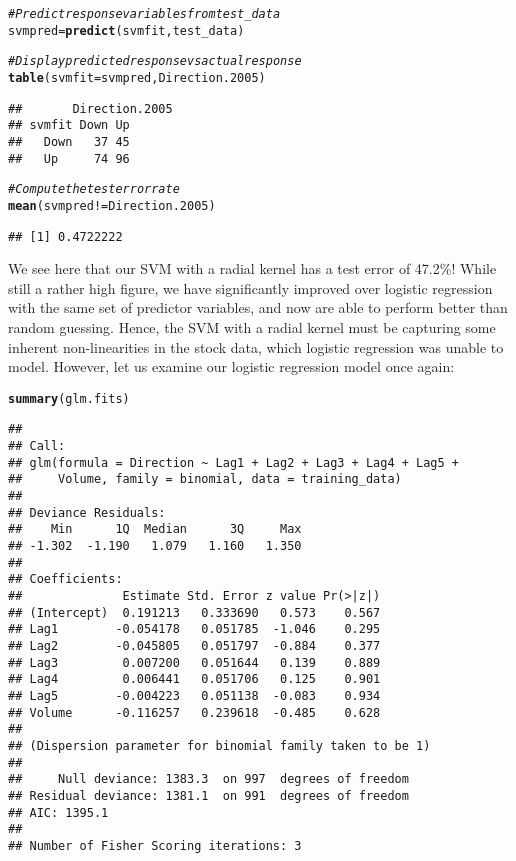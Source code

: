 \documentclass[12pt]{article}\usepackage[]{graphicx}\usepackage[]{color}
\makeatletter
\newcommand{\hlcom}[1]{\textcolor[rgb]{0.678,0.584,0.686}{\textit{#1}}}%
\newcommand{\hlopt}[1]{\textcolor[rgb]{0,0,0}{#1}}%
\newcommand{\hlstd}[1]{\textcolor[rgb]{0.345,0.345,0.345}{#1}}%
\newcommand{\hlkwb}[1]{\textcolor[rgb]{0.69,0.353,0.396}{#1}}%
\newcommand{\hlkwc}[1]{\textcolor[rgb]{0.333,0.667,0.333}{#1}}%
\newcommand{\hlkwd}[1]{\textcolor[rgb]{0.737,0.353,0.396}{\textbf{#1}}}%
\newenvironment{kframe}{%
 \def\at@end@of@kframe{}%
 \ifinner\ifhmode%
  \def\at@end@of@kframe{\end{minipage}}%
  \begin{minipage}{\columnwidth}%
 \fi\fi%
 \def\FrameCommand##1{\hskip\@totalleftmargin \hskip-\fboxsep
 \colorbox{shadecolor}{##1}\hskip-\fboxsep
     \hskip-\linewidth \hskip-\@totalleftmargin \hskip\columnwidth}%
 \MakeFramed {\advance\hsize-\width
   \@totalleftmargin\z@ \linewidth\hsize
   \@setminipage}}%
 {\par\unskip\endMakeFramed%
 \at@end@of@kframe}
\newenvironment{knitrout}{}{} %
\makeatother
\begin{document}
\begin{knitrout}
\begin{kframe}
\begin{alltt}
\hlcom{#Predict response variables from test_data}
\hlstd{svmpred}\hlkwb{=} \hlkwd{predict}\hlstd{(svmfit, test_data)}

\hlcom{#Display predicted response vs actual response}
\hlkwd{table}\hlstd{(}\hlkwc{svmfit} \hlstd{= svmpred, Direction.2005)}
\end{alltt}
\begin{verbatim}
##       Direction.2005
## svmfit Down Up
##   Down   37 45
##   Up     74 96
\end{verbatim}
\begin{alltt}
\hlcom{#Compute the test error rate}
\hlkwd{mean}\hlstd{(svmpred} \hlopt{!=} \hlstd{Direction.2005)}
\end{alltt}
\begin{verbatim}
## [1] 0.4722222
\end{verbatim}
\end{kframe}
\end{knitrout}

We see here that our SVM with a radial kernel has a test error of 47.2\%! While still a rather high figure, we have significantly improved over logistic regression with the same set of predictor variables, and now are able to perform better than random guessing. Hence, the SVM with a radial kernel must be capturing some inherent non-linearities in the stock data, which logistic regression was unable to model. However, let us examine our logistic regression model once again:

\begin{knitrout}
\color{fgcolor}\begin{kframe}
\begin{alltt}
\hlkwd{summary}\hlstd{(glm.fits)}
\end{alltt}
\begin{verbatim}
## 
## Call:
## glm(formula = Direction ~ Lag1 + Lag2 + Lag3 + Lag4 + Lag5 + 
##     Volume, family = binomial, data = training_data)
## 
## Deviance Residuals: 
##    Min      1Q  Median      3Q     Max  
## -1.302  -1.190   1.079   1.160   1.350  
## 
## Coefficients:
##              Estimate Std. Error z value Pr(>|z|)
## (Intercept)  0.191213   0.333690   0.573    0.567
## Lag1        -0.054178   0.051785  -1.046    0.295
## Lag2        -0.045805   0.051797  -0.884    0.377
## Lag3         0.007200   0.051644   0.139    0.889
## Lag4         0.006441   0.051706   0.125    0.901
## Lag5        -0.004223   0.051138  -0.083    0.934
## Volume      -0.116257   0.239618  -0.485    0.628
## 
## (Dispersion parameter for binomial family taken to be 1)
## 
##     Null deviance: 1383.3  on 997  degrees of freedom
## Residual deviance: 1381.1  on 991  degrees of freedom
## AIC: 1395.1
## 
## Number of Fisher Scoring iterations: 3
\end{verbatim}
\end{kframe}
\end{knitrout}
\end{document}
